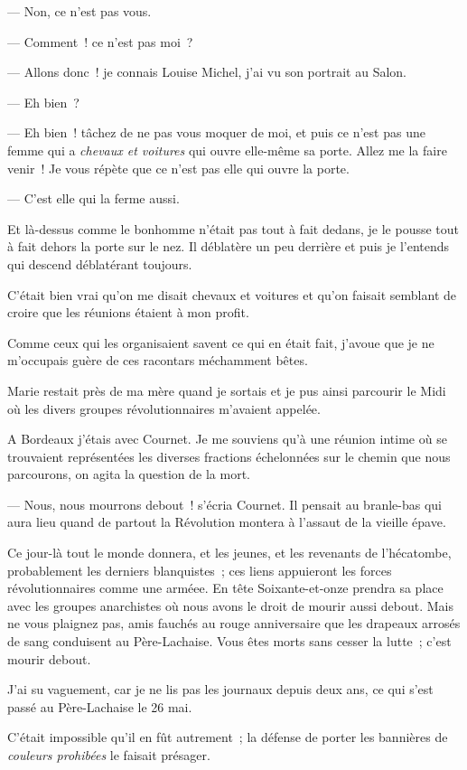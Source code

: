 \documentclass[french,twoside]{book} %
\begin{document}
— Non, ce n’est pas vous.\par
— Comment ! ce n’est pas moi ?\par
— Allons donc ! je connais Louise Michel, j’ai vu son portrait au Salon.\par
— Eh bien ?\par
— Eh bien ! tâchez de ne pas vous moquer de moi, et puis ce n’est pas une femme qui a \emph{chevaux et voitures} qui ouvre elle-même sa porte. Allez me la faire venir ! Je vous répète que ce n’est pas elle qui ouvre la porte.\par
— C’est elle qui la ferme aussi.\par
Et là-dessus comme le bonhomme n’était pas tout à fait dedans, je le pousse tout à fait dehors la porte sur le nez. Il déblatère un peu derrière et puis je l’entends qui descend déblatérant toujours.\par
C’était bien vrai qu’on me disait chevaux et voitures et qu’on faisait semblant de croire que les réunions étaient à mon profit.\par
Comme ceux qui les organisaient savent ce qui en était fait, j’avoue que je ne m’occupais guère de ces racontars méchamment bêtes.\par
 Marie restait près de ma mère quand je sortais et je pus ainsi parcourir le Midi où les divers groupes révolutionnaires m’avaient appelée.\par
A Bordeaux j’étais avec Cournet. Je me souviens qu’à une réunion intime où se trouvaient représentées les diverses fractions échelonnées sur le chemin que nous parcourons, on agita la question de la mort.\par
— Nous, nous mourrons debout ! s’écria Cournet. Il pensait au branle-bas qui aura lieu quand de partout la Révolution montera à l’assaut de la vieille épave.\par
Ce jour-là tout le monde donnera, et les jeunes, et les revenants de l’hécatombe, probablement les derniers blanquistes ; ces liens appuieront les forces révolutionnaires comme une arméee. En tête Soixante-et-onze prendra sa place avec les groupes anarchistes où nous avons le droit de mourir aussi debout. Mais ne vous plaignez pas, amis fauchés au rouge anniversaire que les drapeaux arrosés de sang conduisent au Père-Lachaise. Vous êtes morts sans cesser la lutte ; c’est mourir debout.\par
J’ai su vaguement, car je ne lis pas les journaux depuis deux ans, ce qui s’est passé au Père-Lachaise le 26 mai.\par
C’était impossible qu’il en fût autrement ; la  défense de porter les bannières de \emph{couleurs prohibées} le faisait présager.\par
\end{document}
